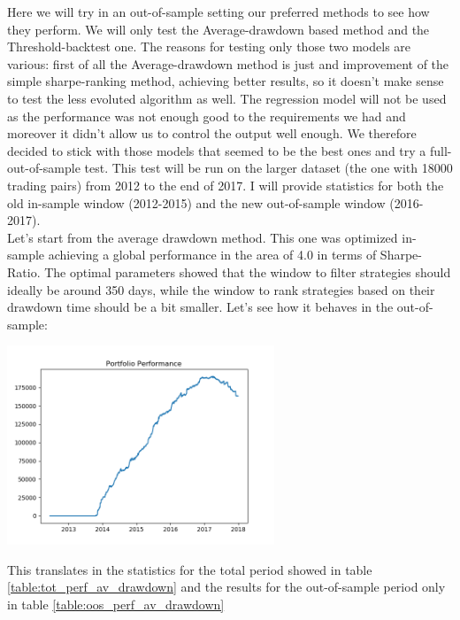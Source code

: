 Here we will try in an out-of-sample setting our preferred methods to see how they perform. We will only test the Average-drawdown based method and the Threshold-backtest one. The reasons for testing only those two models are various: first of all the Average-drawdown method is just and improvement of the simple sharpe-ranking method, achieving better results, so it doesn't make sense to test the less evoluted algorithm as well. The regression model will not be used as the performance was not enough good to the requirements we had and moreover it didn't allow us to control the output well enough. We therefore decided to stick with those models that seemed to be the best ones and try a full-out-of-sample test. This test will be run on the larger dataset (the one with 18000 trading pairs) from 2012 to the end of 2017. I will provide statistics for both the old in-sample window (2012-2015) and the new out-of-sample window (2016-2017).\\
Let's start from the average drawdown method. This one was optimized in-sample achieving a global performance in the area of 4.0 in terms of Sharpe-Ratio. The optimal parameters showed that the window to filter strategies should ideally be around 350 days, while the window to rank strategies based on their drawdown time should be a bit smaller. Let's see how it behaves in the out-of-sample:\\

\begin{center}
	\centering
	\includegraphics[width=0.6\textwidth]{GridSearches/Average_Drawdown/OOs_PnL_Line.png}
	\label{Average_Drawdown_OOS}
\end{center}

This translates in the statistics for the total period showed in table \ref{table:tot_perf_av_drawdown} and the results for the out-of-sample period only in table \ref{table:oos_perf_av_drawdown}

